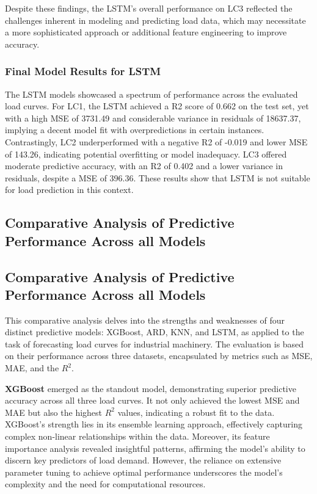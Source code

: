 \documentclass{article} %
\begin{document}
Despite these findings, the \gls*{LSTM}'s overall performance on \gls*{LC3} reflected the challenges inherent in modeling and predicting load data, which may necessitate a more sophisticated approach or additional feature engineering to improve accuracy.

\subsubsection{Final Model Results for LSTM}

The \gls*{LSTM} models showcased a spectrum of performance across the evaluated load curves. For \gls*{LC1}, the \gls*{LSTM} achieved a \gls*{R2} score of 0.662 on the test set, yet with a high \gls*{MSE} of 3731.49 and considerable variance in residuals of 18637.37, implying a decent model fit with overpredictions in certain instances. Contrastingly, \gls*{LC2} underperformed with a negative \gls*{R2} of -0.019 and lower \gls*{MSE} of 143.26, indicating potential overfitting or model inadequacy. \gls*{LC3} offered moderate predictive accuracy, with an \gls*{R2} of 0.402 and a lower variance in residuals, despite a \gls*{MSE} of 396.36. 
These results show that \gls*{LSTM} is not suitable for load prediction in this context.



 \subsection{Comparative Analysis of Predictive Performance Across all Models} 
 \subsection{Comparative Analysis of Predictive Performance Across all Models}

This comparative analysis delves into the strengths and weaknesses of four distinct predictive models: XGBoost, ARD, KNN, and LSTM, as applied to the task of forecasting load curves for industrial machinery. The evaluation is based on their performance across three datasets, encapsulated by metrics such as MSE, MAE, and the $R^2$.

\textbf{XGBoost }emerged as the standout model, demonstrating superior predictive accuracy across all three load curves. It not only achieved the lowest MSE and MAE but also the highest $R^2$ values, indicating a robust fit to the data. XGBoost's strength lies in its ensemble learning approach, effectively capturing complex non-linear relationships within the data. Moreover, its feature importance analysis revealed insightful patterns, affirming the model's ability to discern key predictors of load demand. However, the reliance on extensive parameter tuning to achieve optimal performance underscores the model's complexity and the need for computational resources.
\end{document}
